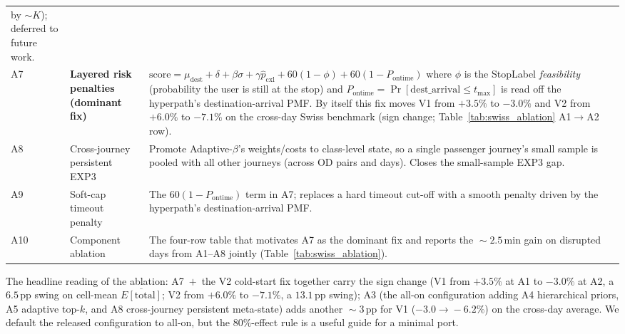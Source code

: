 \documentclass[11pt]{article}
\theoremstyle{definition}
\theoremstyle{remark}
\begin{document}
\begin{table}[!htbp]
\begin{tabular}{l p{3.4cm} p{5.6cm}}
by $\sim K$); deferred to future work. \\
A7 & \textbf{Layered risk penalties (dominant fix)} &
$\mathrm{score}=\mu_{\text{dest}}+\delta+\beta\sigma+\gamma\hat p_{\mathrm{cxl}}+60(1{-}\phi)+60(1{-}P_{\text{ontime}})$
where $\phi$ is the StopLabel \emph{feasibility} (probability the
user is still at the stop) and $P_{\text{ontime}}=\Pr[\mathrm{
dest\_arrival}\leq t_{\max}]$ is read off the hyperpath's
destination-arrival PMF. By itself this fix moves V1 from $+3.5\%$
to $-3.0\%$ and V2 from $+6.0\%$ to $-7.1\%$ on the cross-day
Swiss benchmark (sign change; Table~\ref{tab:swiss_ablation}
A1$\to$A2 row). \\
A8 & Cross-journey persistent EXP3 & Promote Adaptive-$\beta$'s
weights/costs to class-level state, so a single passenger journey's
small sample is pooled with all other journeys (across OD pairs and
days). Closes the small-sample EXP3 gap. \\
A9 & Soft-cap timeout penalty & The $60(1-P_{\text{ontime}})$ term
in A7; replaces a hard timeout cut-off with a smooth penalty driven
by the hyperpath's destination-arrival PMF. \\
A10 & Component ablation     & The four-row table that motivates A7
as the dominant fix and reports the $\!\sim\!2.5$\,min gain on
disrupted days from A1--A8 jointly (Table~\ref{tab:swiss_ablation}). \\
\bottomrule
\end{tabular}
\end{table}

The headline reading of the ablation: A7~$+$~the V2 cold-start fix
together carry the sign change (V1 from $+3.5\%$ at A1 to $-3.0\%$
at A2, a $6.5$\,pp swing on cell-mean $\overline{E[\mathrm{total}]}$;
V2 from $+6.0\%$ to $-7.1\%$, a $13.1$\,pp swing); A3 (the all-on
configuration adding A4 hierarchical priors, A5 adaptive top-$k$,
and A8 cross-journey persistent meta-state) adds another
$\!\sim\!3$\,pp for V1 ($-3.0\!\to\!-6.2\%$) on the cross-day
average. We default the
released configuration to all-on, but the
$80\%$-effect rule is a useful guide for a minimal port.
\end{document}

